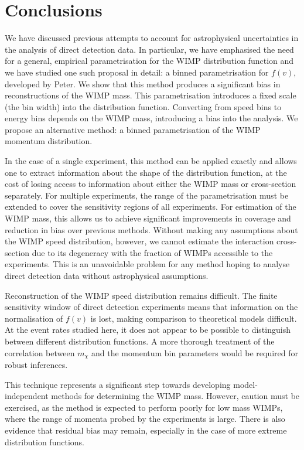 \section{Conclusions}
\label{sec:Speed:Conclusion}

We have discussed previous attempts to account for astrophysical uncertainties in the analysis of direct detection data. In particular, we have emphasised the need for a general, empirical parametrisation for the WIMP distribution function and we have studied one such proposal in detail: a binned parametrisation for $f(v)$, developed by Peter. We show that this method produces a significant bias in reconstructions of the WIMP mass. This parametrisation introduces a fixed scale (the bin width) into the distribution function. Converting from speed bins to energy bins depends on the WIMP mass, introducing a bias into the analysis. We propose an alternative method: a binned parametrisation of the WIMP momentum distribution.

In the case of a single experiment, this method can be applied exactly and allows one to extract information about the shape of the distribution function, at the cost of losing access to information about either the WIMP mass or cross-section separately. For multiple experiments, the range of the parametrisation must be extended to cover the sensitivity regions of all experiments. For estimation of the WIMP mass, this allows us to achieve significant improvements in coverage and reduction in bias over previous methods. Without making any assumptions about the WIMP speed distribution, however, we cannot estimate the interaction cross-section due to its degeneracy with the fraction of WIMPs accessible to the experiments. This is an unavoidable problem for any method hoping to analyse direct detection data without astrophysical assumptions.

Reconstruction of the WIMP speed distribution remains difficult. The finite sensitivity window of direct detection experiments means that information on the normalisation of \(f(v)\) is lost, making comparison to theoretical models difficult. At the event rates studied here, it does not appear to be possible to distinguish between different distribution functions. A more thorough treatment of the correlation between $m_\chi$ and the momentum bin parameters would be required for robust inferences.

This technique represents a significant step towards developing model-independent methods for determining the WIMP mass. However, caution must be exercised, as the method is expected to perform poorly for low mass WIMPs, where the range of momenta probed by the experiments is large. There is also evidence that residual bias may remain, especially in the case of more extreme distribution functions.



